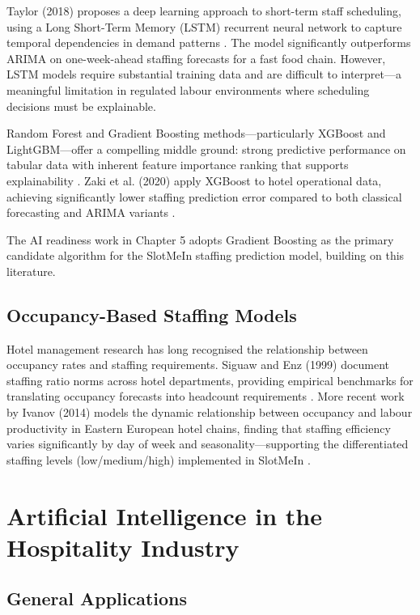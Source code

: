 \documentclass[12pt,a4paper]{report}
\begin{document}
Taylor (2018) proposes a deep learning approach to short-term staff scheduling, using a Long Short-Term Memory (LSTM) recurrent neural network to capture temporal dependencies in demand patterns \cite{taylor_2018}. The model significantly outperforms ARIMA on one-week-ahead staffing forecasts for a fast food chain. However, LSTM models require substantial training data and are difficult to interpret—a meaningful limitation in regulated labour environments where scheduling decisions must be explainable.

Random Forest and Gradient Boosting methods—particularly XGBoost and LightGBM—offer a compelling middle ground: strong predictive performance on tabular data with inherent feature importance ranking that supports explainability \cite{chen_guestrin_2016}. Zaki et al. (2020) apply XGBoost to hotel operational data, achieving significantly lower staffing prediction error compared to both classical forecasting and ARIMA variants \cite{zaki_et_al_2020}.

The AI readiness work in Chapter 5 adopts Gradient Boosting as the primary candidate algorithm for the SlotMeIn staffing prediction model, building on this literature.

\subsection{Occupancy-Based Staffing Models}

Hotel management research has long recognised the relationship between occupancy rates and staffing requirements. Siguaw and Enz (1999) document staffing ratio norms across hotel departments, providing empirical benchmarks for translating occupancy forecasts into headcount requirements \cite{siguaw_enz_1999}. More recent work by Ivanov (2014) models the dynamic relationship between occupancy and labour productivity in Eastern European hotel chains, finding that staffing efficiency varies significantly by day of week and seasonality—supporting the differentiated staffing levels (low/medium/high) implemented in SlotMeIn \cite{ivanov_2014}.

\section{Artificial Intelligence in the Hospitality Industry}

\subsection{General Applications}
\end{document}
